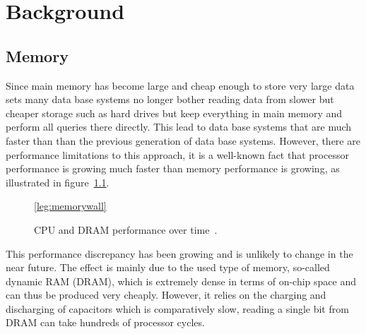 \chapter{Background}

\section{Memory}

Since main memory has become large and cheap enough to store very large data
sets many data base systems no longer bother reading data from slower but
cheaper storage such as hard drives but keep everything in main memory and
perform all queries there directly. This lead to data base systems that are much
faster than than the previous generation of data base systems. However, there
are performance limitations to this approach, it is a well-known fact that
processor performance is growing much faster than memory performance is growing,
as illustrated in figure~\ref{fig:memorywall}.

\begin{figure}[h] \begin{center}
\ref*{leg:memorywall}
\end{center}
\caption{CPU and DRAM performance over time~\cite{hennessyarch}.}
\label{fig:memorywall}
\end{figure}

This performance discrepancy has been growing and is unlikely to change in the
near future. The effect is mainly due to the used type of memory, so-called
dynamic RAM (DRAM), which is extremely dense in terms of on-chip space and can
thus be produced very cheaply. However, it relies on the charging and
discharging of capacitors which is comparatively slow, reading a single bit from
DRAM can take hundreds of processor cycles.

